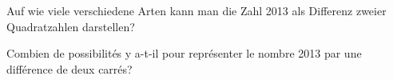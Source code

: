 Auf wie viele verschiedene Arten kann man die Zahl 2013 als Differenz zweier Quadratzahlen darstellen?

\bigskip

Combien de possibilités y a-t-il pour représenter le nombre 2013 par une différence de deux carrés?